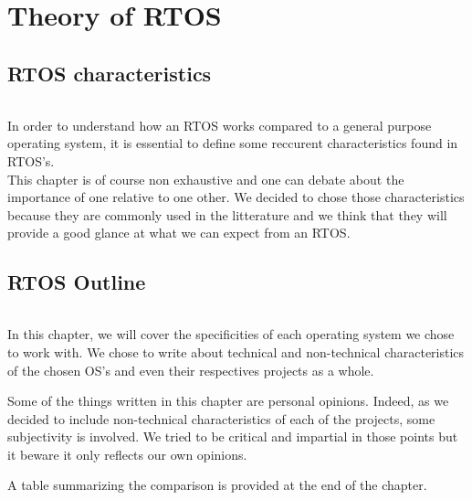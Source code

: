 \part{Theory of RTOS\label{part:rtos-theory}}

\chapter{RTOS characteristics}

\paragraph{}
In order to understand how an RTOS works compared to a general purpose operating system, it is essential to define some reccurent characteristics found in RTOS's.
\\
This chapter is of course non exhaustive and one can debate about the importance of one relative to one other.
We decided to chose those characteristics because they are commonly used in the litterature and we think that they will provide a good glance at what we can expect from an RTOS.











\chapter{RTOS Outline}

\paragraph{}
In this chapter, we will cover the specificities of each operating system we chose to work with.
We chose to write about technical and non-technical characteristics of the chosen OS's and even their respectives projects as a whole.

Some of the things written in this chapter are personal opinions.
Indeed, as we decided to include non-technical characteristics of each of the projects, some subjectivity is involved.
We tried to be critical and impartial in those points but it beware it only reflects our own opinions.


A table summarizing the comparison is provided at the end of the chapter.





